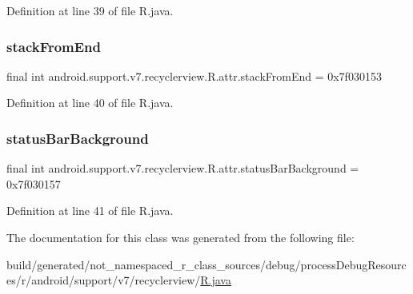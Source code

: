 Definition at line 39 of file R.\+java.

\mbox{\label{classandroid_1_1support_1_1v7_1_1recyclerview_1_1_r_1_1attr_ad048157c30076371166ead7bb83de5f3}} 
\subsubsection{\texorpdfstring{stackFromEnd}{stackFromEnd}}
{\footnotesize\ttfamily final int android.\+support.\+v7.\+recyclerview.\+R.\+attr.\+stack\+From\+End = 0x7f030153\hspace{0.3cm}{\ttfamily [static]}}



Definition at line 40 of file R.\+java.

\mbox{\label{classandroid_1_1support_1_1v7_1_1recyclerview_1_1_r_1_1attr_aa5139957d7634ac7127856d8307007af}} 
\subsubsection{\texorpdfstring{statusBarBackground}{statusBarBackground}}
{\footnotesize\ttfamily final int android.\+support.\+v7.\+recyclerview.\+R.\+attr.\+status\+Bar\+Background = 0x7f030157\hspace{0.3cm}{\ttfamily [static]}}



Definition at line 41 of file R.\+java.



The documentation for this class was generated from the following file\+:\begin{DoxyCompactItemize}
\item 
build/generated/not\+\_\+namespaced\+\_\+r\+\_\+class\+\_\+sources/debug/process\+Debug\+Resources/r/android/support/v7/recyclerview/\mbox{\hyperlink{android_2support_2v7_2recyclerview_2_r_8java}{R.\+java}}\end{DoxyCompactItemize}
